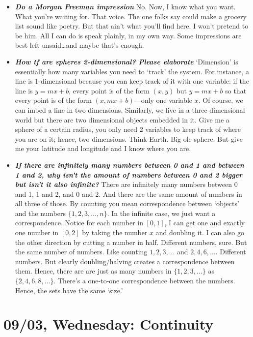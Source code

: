 \documentclass[11pt,letterpaper]{article}
\begin{document}
\begin{itemize}
\item {\bfseries\itshape Do a Morgan Freeman impression} No. Now, I know what you want. What you're waiting for. That voice. The one folks say could make a grocery list sound like poetry. But that ain't what you'll find here. I won't pretend to be him. All I can do is speak plainly, in my own way. Some impressions are best left unsaid\dots and maybe that’s enough. 

\item {\bfseries\itshape How tf are spheres 2-dimensional? Please elaborate} `Dimension' is essentially how many variables you need to `track' the system. For instance, a line is 1-dimensional because you can keep track of it with one variable: if the line is $y= mx + b$, every point is of the form $(x, y)$ but $y= mx + b$ so that every point is of the form $(x, mx + b)$---only one variable $x$. Of course, we can imbed a line in two dimensions. Similarly, we live in a three dimensional world but there are two dimensional objects embedded in it. Give me a sphere of a certain radius, you only need 2 variables to keep track of where you are on it; hence, two dimensions. Think Earth. Big ole sphere. But give me your latitude and longitude and I know where you are.

\item {\bfseries\itshape If there are infinitely many numbers between 0 and 1 and between 1 and 2, why isn't the amount of numbers between 0 and 2 bigger but isn't it also infinite?} There are infinitely many numbers between 0 and 1, 1 and 2, and 0 and 2. And there are the same amount of numbers in all three of those. By counting you mean correspondence between `objects' and the numbers $\{1, 2, 3, \ldots, n \}$. In the infinite case, we just want a correspondence. Notice for each number in $[0, 1]$, I can get one and exactly one number in $[0, 2]$ by taking the number $x$ and doubling it. I can also go the other direction by cutting a number in half. Different numbers, sure. But the same number of numbers. Like counting $1, 2, 3, \ldots$ and $2, 4, 6, \ldots$. Different numbers. But clearly doubling/halving creates a correspondence between them. Hence, there are are just as many numbers in $\{1, 2, 3, \ldots \}$ as $\{2 , 4, 6, 8, \ldots \}$. There's a one-to-one correspondence between the numbers. Hence, the sets have the same `size.'
\end{itemize}

\newpage
\section*{09/03, Wednesday: Continuity\label{09-03}}
\end{document}
